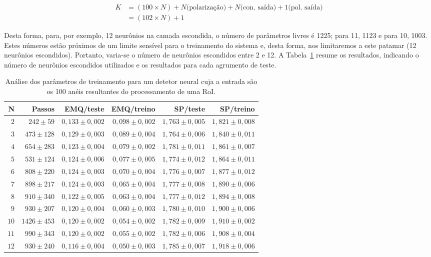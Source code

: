 \begin{align}
K &= (100 \times N) + N \text{(polarização)} + N 
\text{(con. saída)} + 1 \text{(pol. saída)} \\
&= (102 \times N) + 1
\end{align}

Desta forma, para, por exemplo, 12 neurônios na camada escondida, o número de
parâmetros livres é 1225; para 11, 1123 e para 10, 1003. Estes números estão
próximos de um limite sensível para o treinamento do sistema e, desta forma,
nos limitaremos a este patamar (12 neurônios escondidos). Portanto, varia-se o
número de neurônios escondidos entre 2 e 12. A
Tabela~\ref{tab:ringer-param-optimization} resume os resultados, indicando o
número de neurônios escondidos utilizados e os resultados para cada agrumento
de teste.

\begin{table}
\caption{Análise dos parâmetros de treinamento para um detetor neural cuja a
entrada são os 100 anéis resultantes do processamento de uma RoI.}
\label{tab:ringer-param-optimization}
\begin{center}
\begin{tabular}{|r|r|r|r|r|r|} \hline
N & Passos & EMQ/teste & EMQ/treino & SP/teste & SP/treino \\ \hline 
$2$ & $242\pm59$ & $0,133\pm0,002$ & $0,098\pm0,002$ & $1,763\pm0,005$ &
$1,821\pm0,008$ \\ 
$3$ & $473\pm128$ & $0,129\pm0,003$ & $0,089\pm0,004$ & $1,764\pm0,006$ & $1,840
\pm0,011$ \\
$4$ & $654\pm283$ & $0,123\pm0,004$ & $0,079\pm0,002$ & $1,781\pm0,011$ & $1,861
\pm0,007$ \\
$5$ & $531\pm124$ & $0,124\pm0,006$ & $0,077\pm0,005$ & $1,774\pm0,012$ & $1,864
\pm0,011$ \\
$6$ & $808\pm220$ & $0,124\pm0,003$ & $0,070\pm0,004$ & $1,776\pm0,007$ & $1,877
\pm0,012$ \\
$7$ & $898\pm217$ & $0,124\pm0,003$ & $0,065\pm0,004$ & $1,777\pm0,008$ & $1,890
\pm0,006$ \\
$8$ & $910\pm340$ & $0,122\pm0,005$ & $0,063\pm0,004$ & $1,777\pm0,012$ & $1,894
\pm0,008$ \\
$9$ & $930\pm207$ & $0,120\pm0,004$ & $0,060\pm0,003$ & $1,780\pm0,010$ & $1,900
\pm0,006$ \\
$10$ & $1426\pm453$ & $0,120\pm0,002$ & $0,054\pm0,002$ & $1,782\pm0,009$ & $1,9
10\pm0,002$ \\
$11$ & $990\pm343$ & $0,120\pm0,002$ & $0,055\pm0,002$ & $1,782\pm0,006$ & $1,90
8\pm0,004$ \\
$12$ & $930\pm240$ & $0,116\pm0,004$ & $0,050\pm0,003$ & $1,785\pm0,007$ & $1,91
8\pm0,006$ \\
\hline
\end{tabular}
\end{center}
\end{table}

